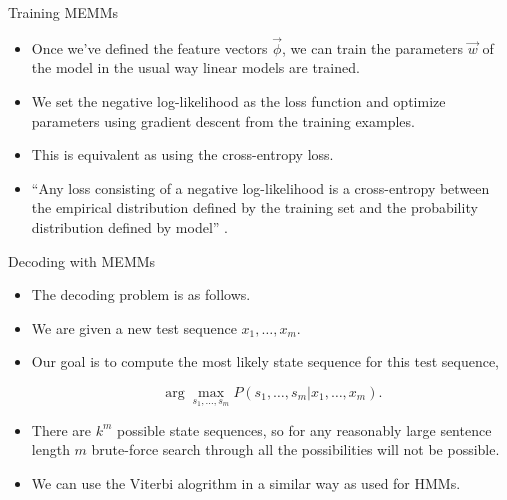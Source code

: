 \documentclass[handout]{beamer}
\begin{document}
\begin{frame}{Training MEMMs}
\begin{scriptsize}
\begin{itemize}

\item Once we've defined the feature vectors $\vec{\phi}$, we can train the parameters $\vec{w}$ of the model in the usual way linear models are trained.

\item We set the negative log-likelihood as the loss function and optimize parameters using gradient descent from the training examples.

\item This is equivalent as using the cross-entropy loss.

\item ``Any loss consisting of a negative log-likelihood is a cross-entropy between the empirical distribution defined by the training set and the probability distribution defined by model'' \cite{goodfellow2016deep}.  
 
\end{itemize}


\end{scriptsize}
\end{frame}




\begin{frame}{Decoding with MEMMs}
\begin{scriptsize}
\begin{itemize}

\item The decoding problem is as follows.
\item We are given a new test sequence $x_1, \dots, x_m$.
\item Our goal is to compute the most likely state sequence for this test sequence,

\begin{equation}
 \operatorname{arg} \max_{s_1,\dots,s_m} P(s_1,\dots,s_m|x_1,\dots,x_m).
\end{equation}

\item There are $k^m$ possible state sequences, so for any reasonably large sentence length $m$ brute-force search through all the possibilities will not be possible.

\item We can use the Viterbi alogrithm in a similar way as used for HMMs.
 
\end{itemize}


\end{scriptsize}
\end{frame}
\end{document}
